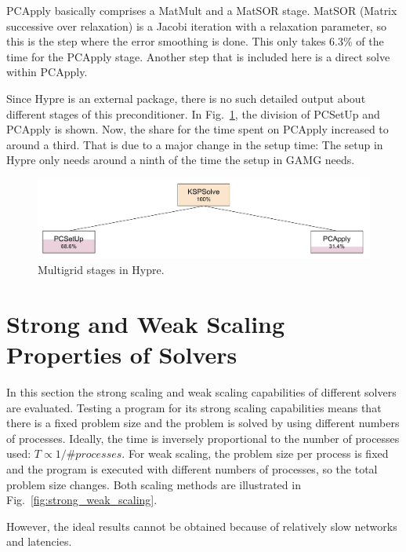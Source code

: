 PCApply basically comprises a MatMult and a MatSOR stage. MatSOR (Matrix successive over relaxation) is a Jacobi iteration with a relaxation parameter, so this is the step where the error smoothing is done. This only takes 6.3\% of the time for the PCApply stage. Another step that is included here is a direct solve within PCApply.

Since Hypre is an external package, there is no such detailed output about different stages of this preconditioner. In Fig.~\ref{fig:multigrid_hierarchy_hypre}, the division of PCSetUp and PCApply is shown. Now, the share for the time spent on PCApply increased to around a third. That is due to a major change in the setup time: The setup in Hypre only needs around a ninth of the time the setup in GAMG needs. 

\begin{figure}[tbp]
	\centering
	\includegraphics[width=1.\textwidth]{Multigrid_hierarchy_Hypre}
	\caption{Multigrid stages in Hypre.} 
	\label{fig:multigrid_hierarchy_hypre}
\end{figure}



\section{Strong and Weak Scaling Properties of Solvers}

In this section the strong scaling and weak scaling capabilities of different solvers are evaluated. Testing a program for its strong scaling capabilities means that there is a fixed problem size and the problem is solved by using different numbers of processes. Ideally, the time is inversely proportional to the number of processes used: $T \propto 1/\textit{\#processes}$. For weak scaling, the problem size per process is fixed and the program is executed with different numbers of processes, so the total problem size changes. Both scaling methods are illustrated in Fig.~\ref{fig:strong_weak_scaling}. 

However, the ideal results cannot be obtained because of relatively slow networks and latencies.



